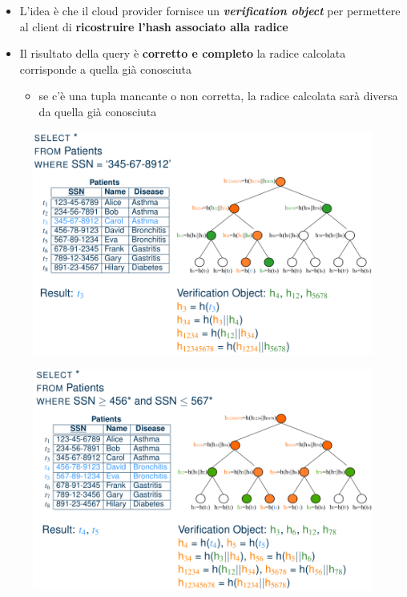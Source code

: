 \documentclass{report}
\begin{document}
\begin{itemize}
    \item L'idea è che il cloud provider fornisce un \textit{\textbf{verification object}} per 
    permettere al client di \textbf{ricostruire l'hash associato alla radice}
    \item Il risultato della query è \textbf{corretto e completo} la radice calcolata 
    corrisponde a quella già conosciuta
    \begin{itemize}
        \item se c'è una tupla mancante o non corretta, la radice calcolata sarà diversa da quella già conosciuta
    \end{itemize}
\end{itemize}

\begin{figure}[H]
    \centering
    \includegraphics[width=1\linewidth]{images/tree-verification.png}
\end{figure}

\begin{figure}[H]
    \centering
    \includegraphics[width=1\linewidth]{images/tree-verification2.png}
\end{figure}
\end{document}
